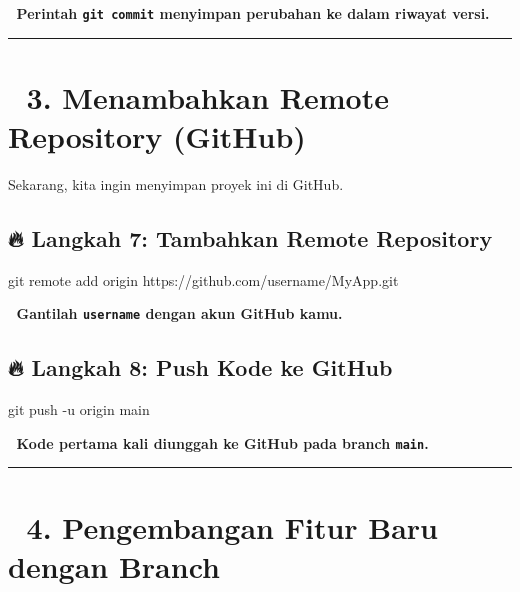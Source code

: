 \documentclass[
  letterpaper,
  DIV=11,
  numbers=noendperiod]{scrreprt}
\newenvironment{Shaded}{\begin{snugshade}}{\end{snugshade}}
\newcommand{\AttributeTok}[1]{\textcolor[rgb]{0.40,0.45,0.13}{#1}}
\newcommand{\FunctionTok}[1]{\textcolor[rgb]{0.28,0.35,0.67}{#1}}
\newcommand{\NormalTok}[1]{\textcolor[rgb]{0.00,0.23,0.31}{#1}}
\begin{document}
📌 \textbf{Perintah \texttt{git\ commit} menyimpan perubahan ke dalam
riwayat versi.}

\begin{center}\rule{0.5\linewidth}{0.5pt}\end{center}

\section{\texorpdfstring{🔹 \textbf{3. Menambahkan Remote Repository
(GitHub)}}{🔹 3. Menambahkan Remote Repository (GitHub)}}\label{menambahkan-remote-repository-github}

Sekarang, kita ingin menyimpan proyek ini di GitHub.

\subsection{\texorpdfstring{🔥 \textbf{Langkah 7: Tambahkan Remote
Repository}}{🔥 Langkah 7: Tambahkan Remote Repository}}\label{langkah-7-tambahkan-remote-repository}

\begin{Shaded}
\begin{Highlighting}[]
\FunctionTok{git}\NormalTok{ remote add origin https://github.com/username/MyApp.git}
\end{Highlighting}
\end{Shaded}

📌 \textbf{Gantilah \texttt{username} dengan akun GitHub kamu.}

\subsection{\texorpdfstring{🔥 \textbf{Langkah 8: Push Kode ke
GitHub}}{🔥 Langkah 8: Push Kode ke GitHub}}\label{langkah-8-push-kode-ke-github}

\begin{Shaded}
\begin{Highlighting}[]
\FunctionTok{git}\NormalTok{ push }\AttributeTok{{-}u}\NormalTok{ origin main}
\end{Highlighting}
\end{Shaded}

📌 \textbf{Kode pertama kali diunggah ke GitHub pada branch
\texttt{main}.}

\begin{center}\rule{0.5\linewidth}{0.5pt}\end{center}

\section{\texorpdfstring{🔹 \textbf{4. Pengembangan Fitur Baru dengan
Branch}}{🔹 4. Pengembangan Fitur Baru dengan Branch}}\label{pengembangan-fitur-baru-dengan-branch}
\end{document}
